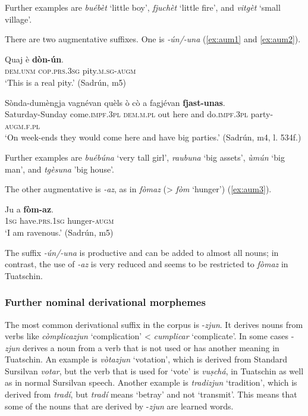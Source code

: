 Further examples are \textit{buébèt} `little boy', \textit{fjuchèt} `little fire', and \textit{vitgèt} `small village'.

There are two augmentative suffixes. One is \textit{-ún/-una} (\ref{ex:aum1} and \ref{ex:aum2}). 

\ea
\label{ex:aum1}
\gll  Quaj è \textbf{dòn-ún}. \\
\textsc{dem.unm} \textsc{cop.prs.3sg} pity.\textsc{m.sg-augm}\\
\glt `This is a real pity.' (Sadrún, m5)
\z

\ea
\label{ex:aum2}
\gll Sònda-dumèngja vagnévan quèls ò cò a fagjévan \textbf{fjast-unas}.\\
Saturday-Sunday come.\textsc{impf.3pl} \textsc{dem.m.pl} out here and do.\textsc{impf.3pl} party-\textsc{augm.f.pl}\\
\glt `On week-ends they would come here and have big parties.' (Sadrún, m4, l. 534f.)
\z

Further examples are \textit{buébúna} `very tall girl', \textit{raubuna} `big assets', \textit{ùmún} `big man', and \textit{tgèsuna} 'big house'.

The other augmentative is \textit{-az}, as in \textit{fòmaz} (> \textit{fòm} `hunger') (\ref{ex:aum3}).

\ea
\label{ex:aum3}
\gll Ju a \textbf{fòm-az}.\\
\textsc{1sg} have.\textsc{prs.1sg} hunger-\textsc{augm}\\
\glt `I am ravenous.' (Sadrún, m5)
\z

The suffix \textit{-ún/-una} is productive and can be added to almost all nouns; in contrast, the use of \textit{-az} is very reduced and seems to be restricted to \textit{fòmaz} in Tuatschin.

\subsubsection{Further nominal derivational morphemes}
The most common derivational suffix in the corpus is -\textit{zjun}. It derives nouns from verbs like \textit{còmplicazjun} `complication' < \textit{cumplicar} `complicate'. In some cases -\textit{zjun} derives a noun from a verb that is not used or has another meaning in Tuatschin. An example is \textit{vòtazjun} `votation', which is derived from Standard Sursilvan \textit{votar}, but the verb that is used for `vote' is \textit{vuṣchá}, in Tuatschin as well as in normal Sursilvan speech. Another example is \textit{tradizjun} `tradition', which is derived from \textit{tradí}, but \textit{tradí} means `betray' and not `transmit'. This means that some of the nouns that are derived by -\textit{zjun} are learned words.

